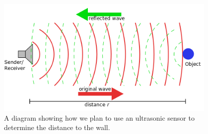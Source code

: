 \begin{figure}[htp]
\centering
\includegraphics[width=0.95\textwidth, angle=0]{Meetings/February/02-08-22/02-08-22 3.PNG}
\caption{A diagram showing how we plan to use an ultrasonic sensor to determine the distance to the wall.}
\label{fig:020822_3}
\end{figure}



